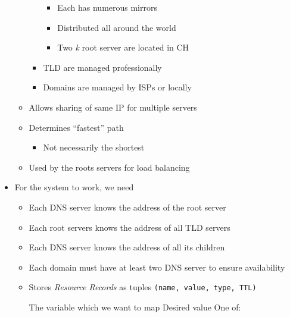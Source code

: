 \begin{itemize}
\begin{itemize}
\begin{itemize}
\begin{itemize}
                            \item Each has numerous mirrors
                            \item Distributed all around the world
                            \item Two \textit{k} root server are located in CH
                        \end{itemize}
                    \item TLD are managed professionally
                    \item Domains are managed by ISPs or locally
                \end{itemize}
        \end{itemize}
        \begin{itemize}
            \item Allows sharing of same IP for multiple servers
            \item Determines ``fastest'' path
                \begin{itemize}
                    \item Not necessarily the shortest
                \end{itemize}
            \item Used by the roots servers for load balancing
        \end{itemize}
    \item For the system to work, we need
        \begin{itemize}
            \item Each DNS server knows the address of the root server
            \item Each root servers knows the address of all TLD servers
            \item Each DNS server knows the address of all its children
        \end{itemize}
        \begin{itemize}
            \item Each domain must have at least two DNS server to ensure availability
            \item Stores \textit{Resource Records} as tuples \verb+(name, value, type, TTL)+
                \begin{itemize}
                     The variable which we want to map
                     Desired value
                     One of:


\end{itemize}
\end{itemize}
\end{itemize}
